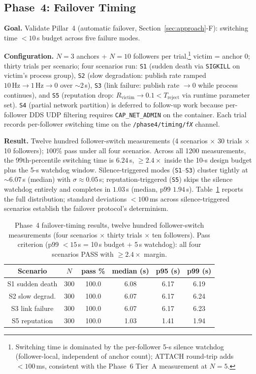 \documentclass[journal,10pt,twocolumn]{IEEEtran}
\begin{document}
\subsection{Phase~4: Failover Timing}
\label{sec:phase4-failover}

\textbf{Goal.} Validate Pillar~4 (automatic failover, Section~\ref{sec:approach}-F): switching time $<10$\,s budget across five failure modes.

\textbf{Configuration.} $N{=}3$ anchors + $N{=}10$ followers per trial,\footnote{Switching time is dominated by the per-follower 5-s silence watchdog (follower-local, independent of anchor count); ATTACH round-trip adds $<100$\,ms, consistent with the Phase~6 Tier~A measurement at $N{=}5$.} victim = anchor 0; thirty trials per scenario; four scenarios run: \texttt{S1} (sudden death via \texttt{SIGKILL} on victim's process group), \texttt{S2} (slow degradation: publish rate ramped $10\,\text{Hz}{\to}1\,\text{Hz}{\to}0$ over $\sim$2\,s), \texttt{S3} (link failure: publish rate $\to 0$ while process continues), and \texttt{S5} (reputation drop: $R_\text{victim}{\to}0.1{<}T_\text{reject}$ via runtime parameter set). \texttt{S4} (partial network partition) is deferred to follow-up work because per-follower DDS UDP filtering requires \texttt{CAP\_NET\_ADMIN} on the container. Each trial records per-follower switching time on the \texttt{/phase4/timing/f\textit{X}} channel.

\textbf{Result.} Twelve hundred follower-switch measurements (4 scenarios $\times$ 30 trials $\times$ 10 followers); $100\%$ pass under all four scenarios. Across all 1200 measurements, the 99th-percentile switching time is $6.24$\,s, $\geq 2.4\times$ inside the 10-s design budget plus the 5-s watchdog window. Silence-triggered modes (\texttt{S1}--\texttt{S3}) cluster tightly at $\sim 6.07$\,s (median) with $\sigma \approx 0.05$\,s; reputation-triggered (\texttt{S5}) skips the silence watchdog entirely and completes in $1.03$\,s (median, p99 $1.94$\,s). Table~\ref{tab:phase4_measured} reports the full distribution; standard deviations $<100$\,ms across silence-triggered scenarios establish the failover protocol's determinism.

\begin{table}[t]
\centering
\caption{Phase~4 failover-timing results, twelve hundred follower-switch measurements (four scenarios $\times$ thirty trials $\times$ ten followers). Pass criterion (p99 $<15$\,s = 10\,s budget $+$ 5\,s watchdog): all four scenarios PASS with $\geq 2.4\times$ margin.}
\label{tab:phase4_measured}
\small
\begin{tabular}{@{}cccccc@{}}
\toprule
Scenario & $N$ & pass \% & median (s) & p95 (s) & p99 (s) \\
\midrule
S1 sudden death  & 300 & 100.0 & 6.08 & 6.17 & 6.19 \\
S2 slow degrad.   & 300 & 100.0 & 6.07 & 6.17 & 6.24 \\
S3 link failure  & 300 & 100.0 & 6.07 & 6.17 & 6.23 \\
S5 reputation     & 300 & 100.0 & 1.03 & 1.41 & 1.94 \\
\bottomrule
\end{tabular}
\end{table}
\end{document}

